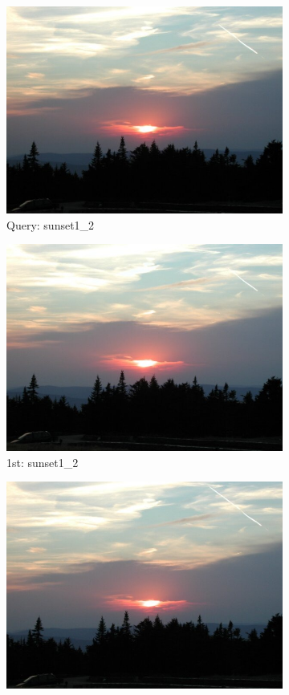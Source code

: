 \documentclass[10pt, a4paper]{article}
\begin{document}
\begin{itemize}
\begin{figure}[H]
	\centering
	\begin{subfigure}{0.25\textwidth}
	  \centering
	  \includegraphics[width=0.9\linewidth]{../input/sunset1_2.jpg}
	  \caption{Query: sunset1\_2}
	\end{subfigure}%
	\begin{subfigure}{0.25\textwidth}
	  \centering
	  \includegraphics[width=0.9\linewidth]{../input/sunset1_1.jpg}
	  \caption{1st: sunset1\_2}
	\end{subfigure}%
	\begin{subfigure}{0.25\textwidth}
        \centering
        \includegraphics[width=0.9\linewidth]{../input/sunset1_3.jpg}

\end{subfigure}
\end{figure}
\end{itemize}
\end{document}
